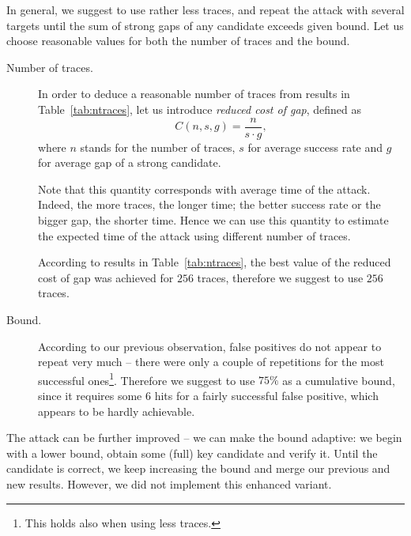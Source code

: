 In general, we suggest to use rather less traces, and repeat the attack with several targets until the sum of strong gaps of any candidate exceeds given bound. Let us choose reasonable values for both the number of traces and the bound.
\begin{description}
	\item[Number of traces.]
		In order to deduce a reasonable number of traces from results in Table~\ref{tab:ntraces}, let us introduce {\em reduced cost of gap}, defined as
		\begin{equation*}
			C(n, s, g) = \frac{n}{s\cdot g} ,
		\end{equation*}
		where $n$ stands for the number of traces, $s$ for average success rate and $g$ for average gap of a strong candidate.
		
		Note that this quantity corresponds with average time of the attack. Indeed, the more traces, the longer time; the better success rate or the bigger gap, the shorter time. Hence we can use this quantity to estimate the expected time of the attack using different number of traces.
		
		According to results in Table~\ref{tab:ntraces}, the best value of the reduced cost of gap was achieved for $256$ traces, therefore we suggest to use $256$ traces.
	\item[Bound.]
		According to our previous observation, false positives do not appear to repeat very much -- there were only a couple of repetitions for the most successful ones\footnote{This holds also when using less traces.}. Therefore we suggest to use $75\%$ as a cumulative bound, since it requires some $6$ hits for a fairly successful false positive, which appears to be hardly achievable.
\end{description}

\begin{remark}
\label{rem:attimpr}
	The attack can be further improved -- we can make the bound adaptive: we begin with a lower bound, obtain some (full) key candidate and verify it. Until the candidate is correct, we keep increasing the bound and merge our previous and new results. However, we did not implement this enhanced variant.
\end{remark}
